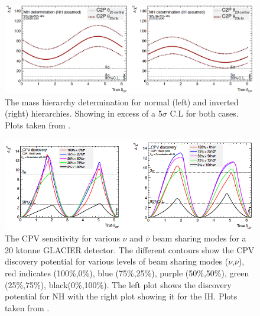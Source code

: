 \begin{figure}[htbp]
\begin{center}
\includegraphics[width=150mm]{Chapter2/figures/massHierarchyPlots.png}
\caption{The mass hierarchy determination for normal (left) and inverted (right) hierarchies. Showing in excess of a 5$\sigma$ C.L for both cases. Plots taken from \cite{lbnoInternal}.}
\label{fig:massHierarchyPlots}
\end{center}
\end{figure}
\vspace{-5mm}
\begin{figure}[htbp]
\begin{center}
\includegraphics[width=150mm]{Chapter2/figures/cpvReach.png}
\caption{The CPV sensitivity for various $\nu$ and $\bar{\nu}$ beam sharing modes for a 20 ktonne GLACIER detector. The different contours show the CPV discovery potential for various levels of beam sharing modes ($\nu$,$\overline{\nu}$), red indicates (100\%,0\%), blue (75\%,25\%), purple (50\%,50\%), green (25\%,75\%), black(0\%,100\%). The left plot shows the discovery potential for NH with the right plot showing it for the IH. Plots taken from \cite{lbnoInternal}.}
\label{fig:cpvReachPlots}
\end{center}
\end{figure}

